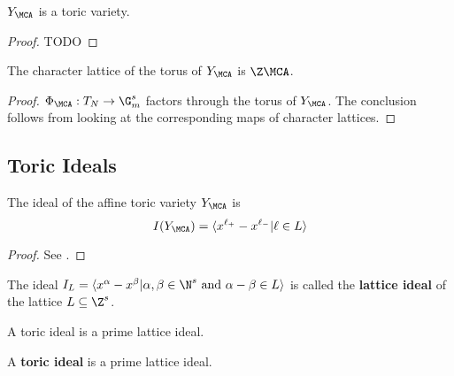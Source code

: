 \begin{proposition}
  \label{1-1-8-aff-tor-var-ya}

  $Y_\MCA$ is a toric variety.
\end{proposition}
\begin{proof}

  TODO
\end{proof}

\begin{proposition}
  \label{1-1-8-char-ya}

  The character lattice of the torus of $Y_\MCA$ is $\Z \MCA$.
\end{proposition}
\begin{proof}

  $\Phi_\MCA: T_N \to \G_m^s$ factors through the torus of $Y_\MCA$.
  The conclusion follows from looking at the corresponding maps of character lattices.
\end{proof}

\subsection{Toric Ideals}


\begin{proposition}
  \label{1-1-9-ideal-ya}

  The ideal of the affine toric variety $Y_\MCA$ is
  \[
    I(Y_\MCA) = \langle x^{\ell_+} - x^{\ell_-} | \ell \in L\rangle
  \]
\end{proposition}
\begin{proof}
  \uses{}

  See \cite{Cox_2011}.
\end{proof}


\begin{definition}
  \label{1-1-10-lat-ideal}
  \uses{}
  \leanok

  The ideal $I_L = \langle x^\alpha - x^\beta | \alpha, \beta \in \N^s \text{ and } \alpha - \beta \in L\rangle$ is called the {\bf lattice ideal} of the lattice $L \subseteq \Z^s$.

  A toric ideal is a prime lattice ideal.
\end{definition}


\begin{definition}
  \label{1-1-10-toric-ideal}
  \leanok
  A {\bf toric ideal} is a prime lattice ideal.
\end{definition}


